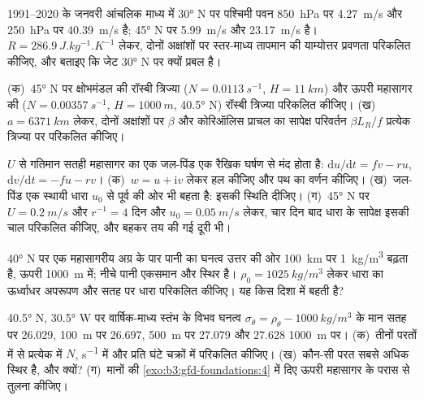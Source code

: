 \begin{exercise}[$\star\star$]\label{exo:b3:gfd-foundations:8}
1991--2020 के जनवरी आंचलिक माध्य में \ang{30} N पर पश्चिमी पवन \qty{850}{hPa} पर \qty{4.27}{m/s} और
\qty{250}{hPa} पर \qty{40.39}{m/s} है; \ang{45} N पर
\qty{5.99}{m/s} और \qty{23.17}{m/s} है। $R =
\qty{286.9}{J.kg^{-1}.K^{-1}}$ लेकर, दोनों अक्षांशों पर स्तर-माध्य तापमान की
याम्योत्तर प्रवणता परिकलित कीजिए, और बताइए कि जेट
\ang{30} N पर क्यों प्रबल है।
\end{exercise}

\begin{exercise}[$\star\star$]\label{exo:b3:gfd-foundations:9}
(क)~\ang{45} N पर क्षोभमंडल की रॉस्बी त्रिज्या ($N =
\qty{0.0113}{s^{-1}}$, $H = \qty{11}{km}$) और ऊपरी
महासागर की ($N = \qty{0.00357}{s^{-1}}$, $H = \qty{1000}{m}$, \ang{40.5} N) रॉस्बी त्रिज्या परिकलित कीजिए।
(ख)~$a = \qty{6371}{km}$ लेकर, दोनों अक्षांशों पर $\beta$ और
कोरिऑलिस प्राचल का सापेक्ष परिवर्तन $\beta L_R/f$ प्रत्येक त्रिज्या पर परिकलित कीजिए।
\end{exercise}

\begin{exercise}[$\star\star\star$]\label{exo:b3:gfd-foundations:10}
$U$ से गतिमान सतही महासागर का एक जल-पिंड एक रैखिक
घर्षण से मंद होता है: $\mathrm du/\mathrm dt = fv - ru$, $\mathrm dv/\mathrm dt = -fu -
rv$। (क)~$w = u + \mathrm iv$ लेकर हल कीजिए और पथ का वर्णन कीजिए।
(ख)~जल-पिंड एक स्थायी धारा $u_0$ से पूर्व की ओर भी बहता है: इसकी
स्थिति दीजिए। (ग)~\ang{45} N पर $U = \qty{0.2}{m/s}$ और $r^{-1} =
\num{4}\text{ दिन}$ और $u_0 = \qty{0.05}{m/s}$ लेकर, चार दिन बाद धारा के सापेक्ष इसकी चाल
परिकलित कीजिए, और बहकर तय की गई दूरी भी।
\end{exercise}

\begin{exercise}[$\star\star\star$]\label{exo:b3:gfd-foundations:11}
\ang{40} N पर एक महासागरीय अग्र के पार पानी का घनत्व
उत्तर की ओर \qty{100}{km} पर \qty{1}{kg/m^3} बढ़ता है, ऊपरी
\qty{1000}{m} में; नीचे पानी एकसमान और स्थिर है। $\rho_0 =
\qty{1025}{kg/m^3}$ लेकर धारा का ऊर्ध्वाधर अपरूपण और
सतह पर धारा परिकलित कीजिए। यह किस दिशा में बहती है?
\end{exercise}

\begin{exercise}[$\star\star\star$]\label{exo:b3:gfd-foundations:12}
\ang{40.5} N, \ang{30.5} W पर वार्षिक-माध्य स्तंभ के विभव
घनत्व $\sigma_\theta = \rho_\theta - \qty{1000}{kg/m^3}$ के मान सतह पर 26.029,
\qty{100}{m} पर 26.697, \qty{500}{m} पर 27.079 और 27.628
\qty{1000}{m} पर। (क)~तीनों परतों में से प्रत्येक में $N$,
\unit{s^{-1}} में और प्रति घंटे चक्रों में परिकलित कीजिए। (ख)~कौन-सी परत सबसे अधिक स्थिर है,
और क्यों? (ग)~मानों की
\cref{exo:b3:gfd-foundations:4} में दिए ऊपरी महासागर के परास से तुलना कीजिए।
\end{exercise}

